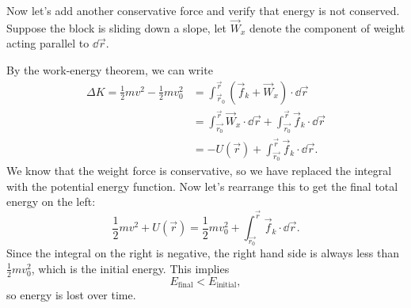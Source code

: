 \documentclass[../classical_mechanics.tex]{subfiles}
\begin{document}
            Now let's add another conservative force and verify that energy is not conserved.
            Suppose the block is sliding down a slope, let $\vec{W}_x$ denote the component of weight acting parallel to $\dd{\vec{r}}$.
            \begin{figure}[H]
                \centering
            \end{figure}
            By the work-energy theorem, we can write
            \begin{align}
                \Delta K=\frac{1}{2}mv^2-\frac{1}{2}mv_0^2&=\int_{\vec{r}_0}^{\vec{r}}(\vec{f}_k+\vec{W}_x)\cdot\dd{\vec{r}}\\
                &=\int_{\vec{r_0}}^{\vec{r}}\vec{W}_x\cdot\dd{\vec{r}}+\int_{\vec{r_0}}^{\vec{r}}\vec{f}_k\cdot\dd{\vec{r}}\\
                &=-U(\vec{r})+\int_{\vec{r_0}}^{\vec{r}}\vec{f}_k\cdot\dd{\vec{r}}.
            \end{align}
            We know that the weight force is conservative, so we have replaced the integral with the potential energy function.
            Now let's rearrange this to get the final total energy on the left:
            \begin{equation}
                \frac{1}{2}mv^2+U(\vec{r})=\frac{1}{2}mv_0^2+\int_{\vec{r_0}}^{\vec{r}}\vec{f}_k\cdot\dd{\vec{r}}.
            \end{equation}
            Since the integral on the right is negative, the right hand side is always less than $\frac{1}{2}mv_0^2$, which is the initial energy.
            This implies
            \begin{equation}
                E_\text{final}<E_\text{initial},
            \end{equation}
            so energy is lost over time.
\end{document}
